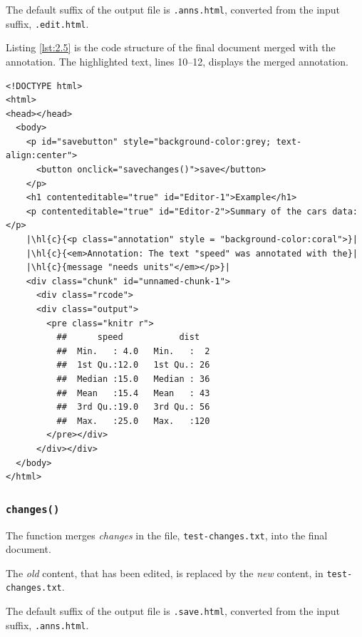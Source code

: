 \documentclass[a4paper, 12pt]{report}
\begin{document}
The default suffix of the output file is \texttt{.anns.html}, converted from the input suffix, \texttt{.edit.html}.

Listing \ref{lst:2.5} is the code structure of the final document merged with the annotation. The highlighted text, lines 10--12, displays the merged annotation.
\begin{lstlisting}[caption={(tidied) \texttt{example1.anns.html}}, escapechar=\|, label={lst:2.5}]
<!DOCTYPE html>
<html>
<head></head>
  <body>
    <p id="savebutton" style="background-color:grey; text-align:center">
      <button onclick="savechanges()">save</button>
    </p>
    <h1 contenteditable="true" id="Editor-1">Example</h1>
    <p contenteditable="true" id="Editor-2">Summary of the cars data:</p>
    |\hl{c}{<p class="annotation" style = "background-color:coral">}|
    |\hl{c}{<em>Annotation: The text "speed" was annotated with the}|
    |\hl{c}{message "needs units"</em></p>}|
    <div class="chunk" id="unnamed-chunk-1">
      <div class="rcode">
      <div class="output">
        <pre class="knitr r">
          ##      speed           dist    
          ##  Min.   : 4.0   Min.   :  2  
          ##  1st Qu.:12.0   1st Qu.: 26  
          ##  Median :15.0   Median : 36  
          ##  Mean   :15.4   Mean   : 43  
          ##  3rd Qu.:19.0   3rd Qu.: 56  
          ##  Max.   :25.0   Max.   :120
        </pre></div>
      </div></div>
  </body>
</html>
\end{lstlisting}


\subsubsection*{\texttt{changes()}}
The function merges \emph{changes} in the file, \texttt{test-changes.txt}, into the final document.

The \emph{old} content, that has been edited, is replaced by the \emph{new} content, in \texttt{test-changes.txt}.

The default suffix of the output file is \texttt{.save.html}, converted from the input suffix, \texttt{.anns.html}.
\end{document}
